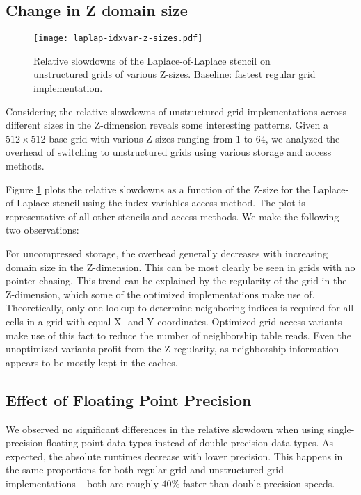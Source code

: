 \subsection{Change in Z domain size}

\begin{figure}
	\texttt{[image: laplap-idxvar-z-sizes.pdf]}
	\caption{\label{fig:laplap-z-sizes} Relative slowdowns of the Laplace-of-Laplace stencil on unstructured grids of various Z-sizes. Baseline: fastest regular grid implementation.}
\end{figure}

Considering the relative slowdowns of unstructured grid implementations across different sizes in the Z-dimension reveals some interesting patterns. Given a $512\times 512$ base grid with various Z-sizes ranging from $1$ to $64$, we analyzed the overhead of switching to unstructured grids using various storage and access methods.

Figure \ref{fig:laplap-z-sizes} plots the relative slowdowns as a function of the Z-size for the Laplace-of-Laplace stencil using the index variables access method. The plot is representative of all other stencils and access methods. We make the following two observations:

For uncompressed storage, the overhead generally decreases with increasing domain size in the Z-dimension. This can be most clearly be seen in grids with no pointer chasing. This trend can be explained by the regularity of the grid in the Z-dimension, which some of the optimized implementations make use of. Theoretically, only one lookup to determine neighboring indices is required for all cells in a grid with equal X- and Y-coordinates. Optimized grid access variants make use of this fact to reduce the number of neighborship table reads. Even the unoptimized variants profit from the Z-regularity, as neighborship information appears to be mostly kept in the caches.


\subsection{Effect of Floating Point Precision}

We observed no significant differences in the relative slowdown when using single-precision floating point data types instead of double-precision data types. As expected, the absolute runtimes decrease with lower precision. This happens in the same proportions for both regular grid and unstructured grid implementations -- both are roughly $40\%$ faster than double-precision speeds.

